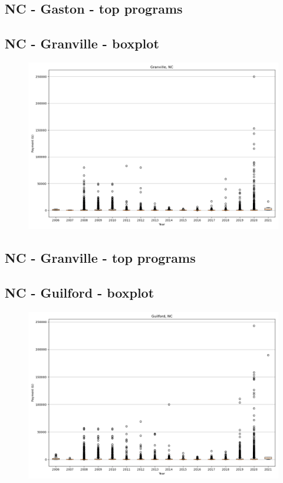 \subsection*{NC - Gaston - top programs}

\newpage
\subsection*{NC - Granville - boxplot}
\begin{figure}[h]
\centering
\includegraphics[width=7in]{../output/boxplots/counties/Granville-NC_boxplot.png}
\end{figure}


\subsection*{NC - Granville - top programs}

\newpage
\subsection*{NC - Guilford - boxplot}
\begin{figure}[h]
\centering
\includegraphics[width=7in]{../output/boxplots/counties/Guilford-NC_boxplot.png}
\end{figure}



